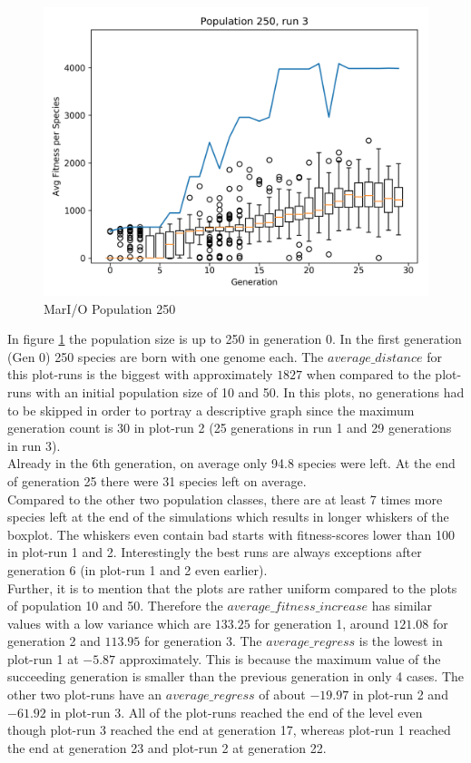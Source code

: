 \begin{figure}[h]
\begin{minipage}{0.33\textwidth}
				\end{minipage}
				\begin{minipage}{0.33\textwidth}
					\centering
					\includegraphics[width=1\textwidth]{graphics/mario/pop250_run3} %
				\end{minipage}
				\caption{MarI/O Population 250}
				\label{fig:mario250}
			\end{figure}
			In figure \ref{fig:mario250} the population size is up to 250 in generation 0. In the first generation (Gen 0) 250 species are born with one genome each. The $average\_distance$ for this plot-runs is the biggest with approximately $1827$ when compared to the plot-runs with an initial population size of 10 and 50. In this plots, no generations had to be skipped in order to portray a descriptive graph since the maximum generation count is 30 in plot-run 2 (25 generations in run 1 and 29 generations in run 3).\\
			Already in the 6th generation, on average only 94.8 species were left. At the end of generation 25 there were 31 species left on average. \\
			Compared to the other two population classes, there are at least 7 times more species left at the end of the simulations which results in longer whiskers of the boxplot. The whiskers even contain bad starts with fitness-scores lower than 100 in plot-run 1 and 2. Interestingly the best runs are always exceptions after generation 6 (in plot-run 1 and 2 even earlier). \\
			Further, it is to mention that the plots are rather uniform compared to the plots of population 10 and 50. Therefore the $average\_fitness\_increase$ has similar values with a low variance which are $133.25$ for generation 1, around $121.08$ for generation 2 and $113.95$ for generation 3. The $average\_regress$ is the lowest in plot-run 1 at $-5.87$ approximately. This is because the maximum value of the succeeding generation is smaller than the previous generation in only 4 cases. The other two plot-runs have an $average\_regress$ of about $-19.97$ in plot-run 2 and $-61.92$ in plot-run 3. All of the plot-runs reached the end of the level even though plot-run 3 reached the end at generation 17, whereas plot-run 1 reached the end at generation 23 and plot-run 2 at generation 22.	
	

